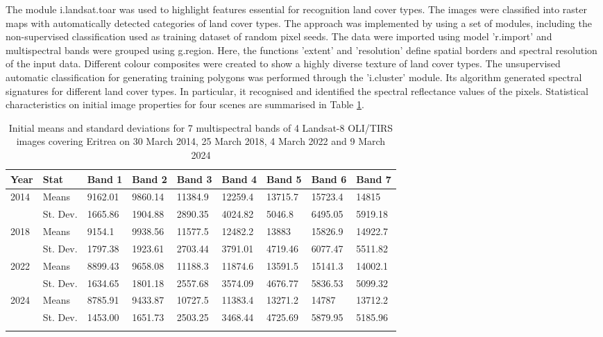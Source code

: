\documentclass[sn-mathphys-num]{sn-jnl}%
\theoremstyle{thmstyleone}%
\theoremstyle{thmstyletwo}%
\theoremstyle{thmstylethree}%
\begin{document}
{{The module i.landsat.toar was used to highlight features essential for recognition land cover types. }The images were classified into raster maps with automatically detected categories of land cover types. The approach was implemented by using a set of modules{, }including {the} non-supervised classification used as training dataset of random pixel seeds.{ The data} were imported {using} model 'r.import' {and} multispectral bands were grouped using g.region. {Here}, the functions 'extent' and 'resolution' define spatial borders and spectral resolution of the input data.{ }Different colour {composites were created to }show a highly diverse texture of land cover types. {The unsupervised automatic classification for generating training polygons was performed through the 'i.cluster' module. Its algorithm generated spectral signatures for different land cover types. In particular, it recognised and identified the spectral reflectance values of the pixels.} Statistical characteristics on initial image properties for four scenes are summarised in Table \ref{tab01}. 

\begin{table}[h]
\caption{Initial means and standard deviations for 7 multispectral bands of 4 Landsat-8 OLI/TIRS images covering Eritrea on 30 March 2014, 25 March 2018, 4 March 2022 and 9 March 2024}\label{tab01}%
\begin{tabular}{@{}lllllllll@{}}
\toprule
{Year} & {Stat} & {Band 1} & {Band 2} & {Band 3} & {Band 4} & {Band 5} & {Band 6} & {Band 7}\\
\midrule
\multirow{ 2}{*}{2014} & Means & 9162.01 & 9860.14 & 11384.9 & 12259.4 & 13715.7 & 15723.4 & 14815 \\
    & St. Dev. & 1665.86 & 1904.88 & 2890.35 & 4024.82 & 5046.8 & 6495.05 & 5919.18 \\
    \midrule
    \multirow{ 2}{*}{2018} &  Means & 9154.1 & 9938.56 & 11577.5 & 12482.2 & 13883 & 15826.9 & 14922.7 \\
    & St. Dev. & 1797.38 & 1923.61 & 2703.44 & 3791.01 & 4719.46 & 6077.47 & 5511.82 \\
    \midrule
    \multirow{ 2}{*}{2022} &  Means & 8899.43 & 9658.08 & 11188.3 & 11874.6 & 13591.5 & 15141.3 & 14002.1 \\
    & St. Dev. & 1634.65 & 1801.18 & 2557.68 & 3574.09 & 4676.77 & 5836.53 & 5099.32 \\
    \midrule
    \multirow{ 2}{*}{2024} &  Means & 8785.91 & 9433.87 & 10727.5 & 11383.4 & 13271.2 & 14787 & 13712.2 \\
    & St. Dev. & 1453.00 & 1651.73 & 2503.25 & 3468.44 & 4725.69 & 5879.95 & 5185.96 \\
\botrule
\end{tabular}
\end{table}

}
\end{document}
